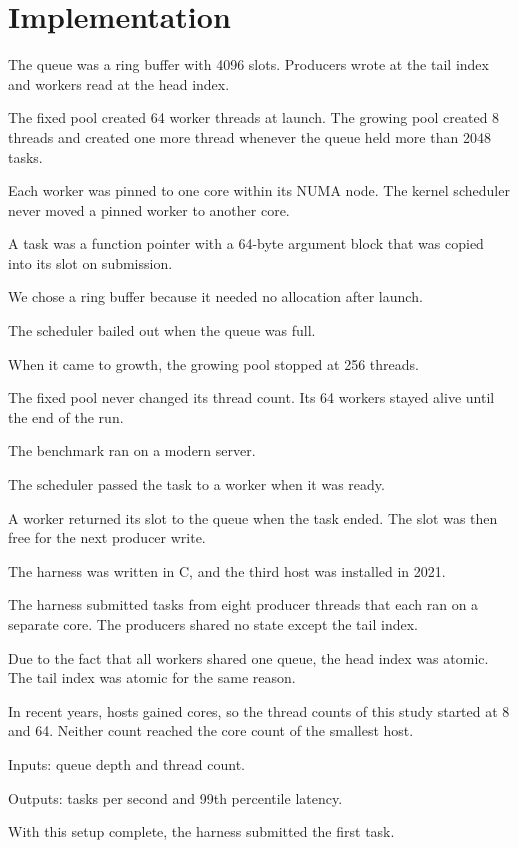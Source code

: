 \section{Implementation}

The queue was a ring buffer with 4096 slots. Producers wrote at the tail index and workers read at the head index.

The fixed pool created 64 worker threads at launch. The growing pool created 8 threads and created one more thread whenever the queue held more than 2048 tasks.

Each worker was pinned to one core within its NUMA node. The kernel scheduler never moved a pinned worker to another core.

A task was a function pointer with a 64-byte argument block that was copied into its slot on submission.

We chose a ring buffer because it needed no allocation after launch.

The scheduler bailed out when the queue was full.

When it came to growth, the growing pool stopped at 256 threads.

The fixed pool never changed its thread count. Its 64 workers stayed alive until the end of the run.

The benchmark ran on a modern server.

The scheduler passed the task to a worker when it was ready.

A worker returned its slot to the queue when the task ended. The slot was then free for the next producer write.

The harness was written in C, and the third host was installed in 2021.

The harness submitted tasks from eight producer threads that each ran on a separate core. The producers shared no state except the tail index.

Due to the fact that all workers shared one queue, the head index was atomic. The tail index was atomic for the same reason.

In recent years, hosts gained cores, so the thread counts of this study started at 8 and 64. Neither count reached the core count of the smallest host.

Inputs: queue depth and thread count.

Outputs: tasks per second and 99th percentile latency.

With this setup complete, the harness submitted the first task.

